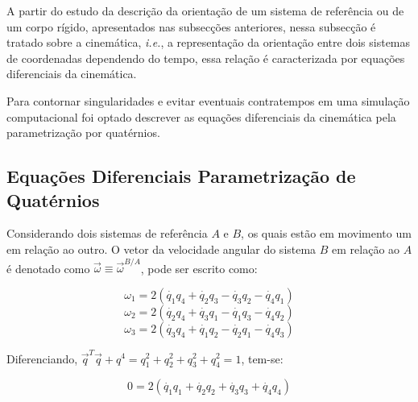 A partir do estudo da descrição da orientação de um sistema de referência ou de um corpo rígido, apresentados nas subsecções anteriores, nessa subsecção é tratado sobre a cinemática, \textit{i.e.}, a representação da orientação entre dois sistemas de coordenadas dependendo do tempo, essa relação é caracterizada por equações diferenciais da cinemática.

Para contornar singularidades e evitar eventuais contratempos em uma simulação computacional foi optado descrever as equações diferenciais da cinemática pela parametrização por quatérnios.

\subsection{Equações Diferenciais Parametrização de Quatérnios}\label{sec:3.1.2.6}

Considerando dois sistemas de referência \begin{math}A\end{math} e \begin{math}B\end{math}, os quais estão em movimento um em relação ao outro. O vetor da velocidade angular do sistema \begin{math}B\end{math} em relação ao \begin{math}A\end{math}
é denotado como \begin{math}\vec{\omega}\equiv\vec{\omega}^{B/A}\end{math}, pode ser escrito como:

\begin{equation}
\omega_1=2(\dot{q_1}q_4+\dot{q_2}q_3-\dot{q_3}q_2-\dot{q_4}q_1)
\end{equation}
\begin{equation}
\omega_2=2(\dot{q_2}q_4+\dot{q_3}q_1-\dot{q_1}q_3-\dot{q_4}q_2)\end{equation}
\begin{equation}
\omega_3=2(\dot{q_3}q_4+\dot{q_1}q_2-\dot{q_2}q_1-\dot{q_4}q_3)
\end{equation}

Diferenciando, \begin{math}\vec{q}^T\vec{q}+q^4=q_1^2+q_2^2+q_3^2+q_4^2=1\end{math}, tem-se:

\begin{equation}0=2(\dot{q_1}q_1+\dot{q_2}q_2+\dot{q_3}q_3+\dot{q_4}q_4)\end{equation}

